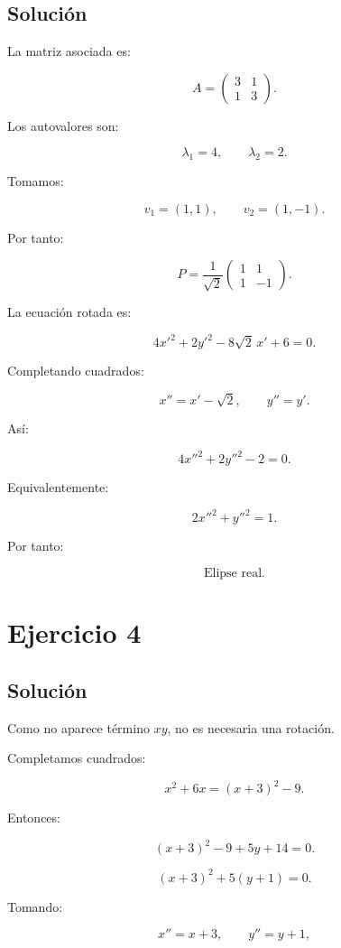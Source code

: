 \documentclass[11pt,a4paper]{article}
\begin{document}
\subsection{Solución}

La matriz asociada es:

\[
A=
\begin{pmatrix}
3&1\\
1&3
\end{pmatrix}.
\]

Los autovalores son:

\[
\lambda_1=4,
\qquad
\lambda_2=2.
\]

Tomamos:

\[
v_1=(1,1),
\qquad
v_2=(1,-1).
\]

Por tanto:

\[
P=
\frac1{\sqrt2}
\begin{pmatrix}
1&1\\
1&-1
\end{pmatrix}.
\]

La ecuación rotada es:

\[
4x'^2+2y'^2-8\sqrt2\,x'+6=0.
\]

Completando cuadrados:

\[
x''=x'-\sqrt2,
\qquad
y''=y'.
\]

Así:

\[
\boxed{
4x''^2+2y''^2-2=0.
}
\]

Equivalentemente:

\[
\boxed{
2x''^2+y''^2=1.
}
\]

Por tanto:

\[
\boxed{\text{Elipse real}.}
\]

\section{Ejercicio 4}
\subsection{Solución}

Como no aparece término $xy$, no es necesaria una rotación.

Completamos cuadrados:

\[
x^2+6x
=
(x+3)^2-9.
\]

Entonces:

\[
(x+3)^2-9+5y+14=0.
\]

\[
(x+3)^2+5(y+1)=0.
\]

Tomando:

\[
x''=x+3,
\qquad
y''=y+1,
\]
\end{document}
